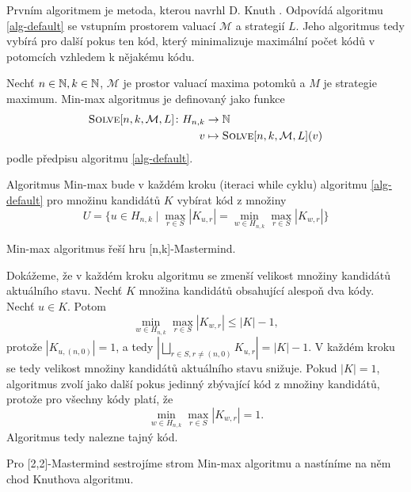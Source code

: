 Prvním algoritmem je metoda, kterou navrhl D. Knuth \cite{donald_e__knuth_1977}. Odpovídá algoritmu \ref{alg-default} se vstupním prostorem valuací $\mathcal{M}$ a strategií $L$. Jeho algoritmus tedy vybírá pro další pokus ten kód, který minimalizuje maximální počet kódů v potomcích vzhledem k nějakému kódu. 

\begin{definice}
    Nechť $n\in \mathbb{N}, k\in \mathbb{N}$, $\mathcal{M}$ je prostor valuací maxima potomků a $M$ je strategie maximum. Min-max algoritmus je definovaný jako funkce 
    \begin{align*}
        \textsc{Solve}[n, k, \mathcal{M}, L] \colon H_{n,k} &\to \mathbb{N} \\
        v & \mapsto \textsc{Solve}[n, k, \mathcal{M}, L](v)
    \end{align*}
    podle předpisu algoritmu \ref{alg-default}.
\end{definice}

Algoritmus Min-max bude v každém kroku (iteraci while cyklu) algoritmu \ref{alg-default} pro množinu kandidátů $K$ vybírat kód z množiny 
\[U = \{u \in H_{n,k} \mid \max_{r\in S} |K_{u,r}| = \min_{w \in H_{n,k}} \max_{r\in S} |K_{w,r}| \}\]

\begin{tvrz}
    Min-max algoritmus řeší hru [n,k]-Mastermind.
\end{tvrz}
\begin{dukaz}
    Dokážeme, že v každém kroku algoritmu se zmenší velikost množiny kandidátů aktuálního stavu. Nechť $K$ množina kandidátů obsahující alespoň dva kódy. Nechť $u \in K$. Potom 
    \[\min_{w \in H_{n,k}} \max_{r\in S} |K_{w,r}| \leq |K|-1,\]
    protože $|K_{u,(n,0)}| = 1$, a tedy $|\bigsqcup_{r\in S, r \neq (n,0)} K_{u,r} | = |K| - 1$. V každém kroku se tedy velikost množiny kandidátů aktuálního stavu snižuje. Pokud $|K| = 1$, algoritmus zvolí jako další pokus jedinný zbývající kód z množiny kandidátů, protože pro všechny kódy platí, že
    \[\min_{w \in H_{n,k}} \max_{r\in S} |K_{w,r}| = 1.\]
    Algoritmus tedy nalezne tajný kód. 
\end{dukaz}



Pro [2,2]-Mastermind sestrojíme strom Min-max algoritmu a nastíníme na něm chod Knuthova algoritmu.


